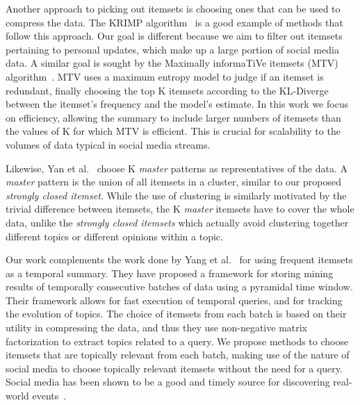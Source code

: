 \documentclass[letterpaper,12pt,titlepage,oneside,final]{book}
\begin{document}
Another approach to picking out itemsets is choosing ones that 
can be used to compress the data. The KRIMP algorithm~\cite{vreeken2011krimp} is 
a good example of methods that follow this approach. Our goal is different because
we aim to filter out itemsets pertaining to personal updates, which make up a large
portion of social media data. 
A similar goal is sought by the Maximally informaTiVe itemsets (MTV) algorithm~\cite{mampaey2011tell}. 
MTV uses a maximum entropy model to judge if an itemset is redundant, finally choosing the
top K itemsets according to the KL-Diverge between the itemset's  frequency and  the model's estimate. 
In this work we focus on efficiency, allowing the summary to include larger numbers
of itemsets than the values of K for which MTV is efficient.
This is crucial for scalability to the volumes of data typical in social media streams.

Likewise, Yan et al.~\cite{yan2005summarizing} choose K \emph{master} patterns as representatives of the data. A \emph{master} pattern is the union of all itemsets in a cluster, similar to our proposed \emph{strongly closed itemset}. 
While the use of clustering is similarly motivated by the trivial difference between itemsets, the K \emph{master} itemsets  have to cover the whole data, unlike the \emph{strongly closed itemsets} which actually avoid clustering together different topics or different opinions within a topic.


Our work complements the work done by Yang et al.~\cite{yang2012framework} for using frequent itemsets as a temporal summary. They have proposed a framework for storing mining results of temporally consecutive batches of data using a pyramidal time window. Their framework allows for fast execution of temporal queries, and for tracking the evolution of topics. 
The choice of itemsets from each batch is based on their utility in compressing the data, and thus they use non-negative matrix factorization to extract topics related to a query. We propose methods to choose itemsets that are topically relevant from each batch, making use of the nature of social media to choose topically relevant itemsets without the need for a query. Social media has been shown to be a good and timely source for discovering real-world events~\cite{ritter2012open,petrovic2010streaming}.
\end{document}
